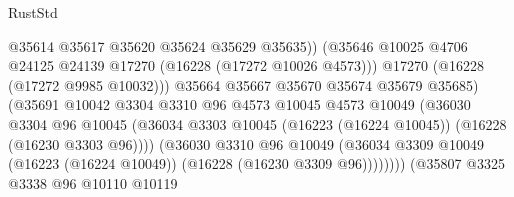 \begin{lexlean}{RustStd}
\begin{coremodule}
                                            @35614
                                            @35617
                                            @35620
                                            @35624
                                            @35629
                                            @35635))
                                        (@35646
                                          @10025
                                          @4706
                                          @24125
                                          @24139
                                          @17270
                                          (@16228 (@17272 @10026 @4573)))
                                        @17270
                                        (@16228 (@17272 @9985 @10032)))
                                      @35664
                                      @35667
                                      @35670
                                      @35674
                                      @35679
                                      @35685)
                                    (@35691
                                      @10042
                                      @3304
                                      @3310
                                      @96
                                      @4573
                                      @10045
                                      @4573
                                      @10049
                                      (@36030
                                        @3304
                                        @96
                                        @10045
                                        (@36034
                                          @3303
                                          @10045
                                          (@16223 (@16224 @10045))
                                          (@16228 (@16230 @3303 @96))))
                                      (@36030
                                        @3310
                                        @96
                                        @10049
                                        (@36034
                                          @3309
                                          @10049
                                          (@16223 (@16224 @10049))
                                          (@16228 (@16230 @3309 @96))))))))
                              (@35807
                                @3325
                                @3338
                                @96
                                @10110
                                @10119

\end{coremodule}
\end{lexlean}
